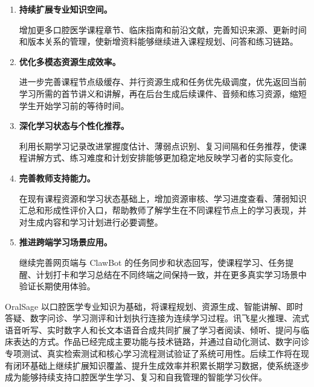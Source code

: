 \begin{enumerate}
  \item \textbf{持续扩展专业知识空间。}

  增加更多口腔医学课程章节、临床指南和前沿文献，完善知识来源、更新时间和版本关系的管理，使新增资料能够继续进入课程规划、问答和练习链路。

  \item \textbf{优化多模态资源生成效率。}

  进一步完善课程节点级缓存、并行资源生成和任务优先级调度，优先返回当前学习所需的首节讲义和讲解，再在后台生成后续课件、音频和练习资源，缩短学生开始学习前的等待时间。

  \item \textbf{深化学习状态与个性化推荐。}

  利用长期学习记录改进掌握度估计、薄弱点识别、复习间隔和任务推荐，使课程讲解方式、练习难度和计划安排能够更加稳定地反映学习者的实际变化。

  \item \textbf{完善教师支持能力。}

  在现有课程资源和学习状态基础上，增加资源审核、学习进度查看、薄弱知识汇总和形成性评价入口，帮助教师了解学生在不同课程节点上的学习表现，并对生成内容和学习计划进行必要调整。

  \item \textbf{推进跨端学习场景应用。}

  继续完善网页端与 ClawBot 的任务同步和状态回写，使课程学习、任务提醒、计划打卡和学习总结在不同终端之间保持一致，并在更多真实学习场景中验证长期使用体验。
\end{enumerate}

OralSage 以口腔医学专业知识为基础，将课程规划、资源生成、智能讲解、即时答疑、数字问诊、学习测评和计划执行连接为连续学习过程。讯飞星火推理、流式语音听写、实时数字人和长文本语音合成共同扩展了学习者阅读、倾听、提问与临床表达的方式。作品已经完成主要功能与技术链路，并通过自动化测试、数字问诊专项测试、真实检索测试和核心学习流程测试验证了系统可用性。后续工作将在现有闭环基础上继续扩展知识覆盖、提升生成效率并积累长期学习数据，使系统逐步成为能够持续支持口腔医学生学习、复习和自我管理的智能学习伙伴。
